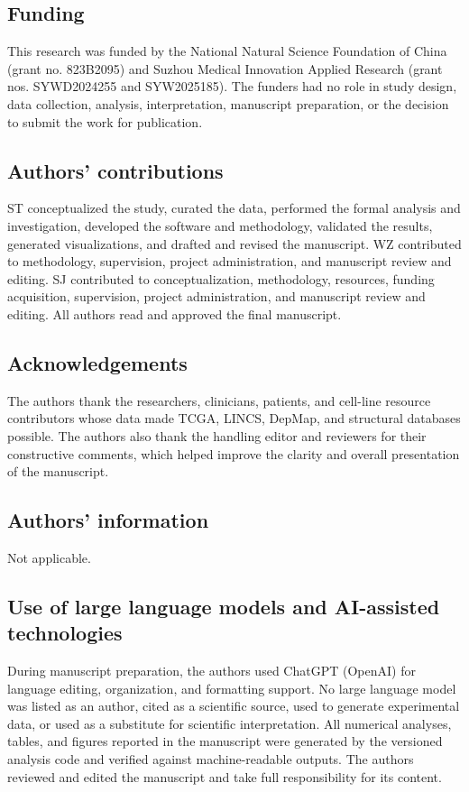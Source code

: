 \subsection*{Funding}
This research was funded by the National Natural Science Foundation of China (grant no. 823B2095) and Suzhou Medical Innovation Applied Research (grant nos. SYWD2024255 and SYW2025185). The funders had no role in study design, data collection, analysis, interpretation, manuscript preparation, or the decision to submit the work for publication.

\subsection*{Authors' contributions}
ST conceptualized the study, curated the data, performed the formal analysis and investigation, developed the software and methodology, validated the results, generated visualizations, and drafted and revised the manuscript. WZ contributed to methodology, supervision, project administration, and manuscript review and editing. SJ contributed to conceptualization, methodology, resources, funding acquisition, supervision, project administration, and manuscript review and editing. All authors read and approved the final manuscript.

\subsection*{Acknowledgements}
The authors thank the researchers, clinicians, patients, and cell-line resource contributors whose data made TCGA, LINCS, DepMap, and structural databases possible. \ifdefined{}\else The authors also thank the handling editor and reviewers for their constructive comments, which helped improve the clarity and overall presentation of the manuscript.\fi

\subsection*{Authors' information}
Not applicable.

\subsection*{Use of large language models and AI-assisted technologies}
During manuscript preparation, the authors used ChatGPT (OpenAI) for language editing, organization, and formatting support. No large language model was listed as an author, cited as a scientific source, used to generate experimental data, or used as a substitute for scientific interpretation. All numerical analyses, tables, and figures reported in the manuscript were generated by the versioned analysis code and verified against machine-readable outputs. The authors reviewed and edited the manuscript and take full responsibility for its content.
